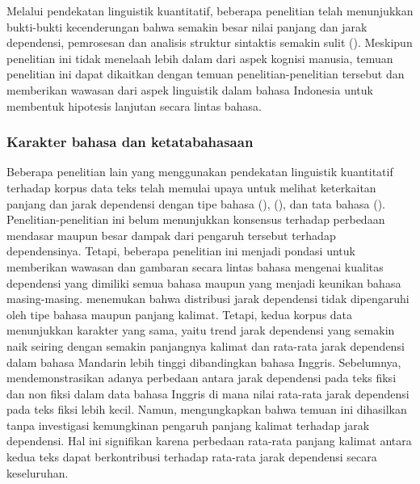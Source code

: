 Melalui pendekatan linguistik kuantitatif, beberapa penelitian telah menunjukkan bukti-bukti kecenderungan bahwa semakin besar nilai panjang dan jarak dependensi, pemrosesan dan analisis struktur sintaktis semakin sulit (\citealp{gibson1998linguistic, hiranuma1999syntactic, jiang2015effects, temperley2007minimization}). Meskipun penelitian ini tidak menelaah lebih dalam dari aspek kognisi manusia, temuan penelitian ini dapat dikaitkan dengan temuan penelitian-penelitian tersebut dan memberikan wawasan dari aspek linguistik dalam bahasa Indonesia untuk membentuk hipotesis lanjutan secara lintas bahasa.

\subsubsection{Karakter bahasa dan ketatabahasaan}
Beberapa penelitian lain yang menggunakan pendekatan linguistik kuantitatif terhadap korpus data teks telah memulai upaya untuk melihat keterkaitan panjang dan jarak dependensi dengan tipe bahasa (\citealp{hiranuma1999syntactic, eppler2005syntax, liu2012quantitative}), (\citealp{oya2011syntactic, ferrer2014risks, jiang2015effects}), dan tata bahasa (\citealp{liu2008dependency, gildea2010grammars}). Penelitian-penelitian ini belum menunjukkan konsensus terhadap perbedaan mendasar maupun besar dampak dari pengaruh tersebut terhadap dependensinya. Tetapi, beberapa penelitian ini menjadi pondasi untuk memberikan wawasan dan gambaran secara lintas bahasa mengenai kualitas dependensi yang dimiliki semua bahasa maupun yang menjadi keunikan bahasa masing-masing. \cite{jiang2015effects} menemukan bahwa distribusi jarak dependensi tidak dipengaruhi oleh tipe bahasa maupun panjang kalimat. Tetapi, kedua korpus data menunjukkan karakter yang sama, yaitu trend jarak dependensi yang semakin naik seiring dengan semakin panjangnya kalimat dan rata-rata jarak dependensi dalam bahasa Mandarin lebih tinggi dibandingkan bahasa Inggris. Sebelumnya, \cite{oya2013degree} mendemonstrasikan adanya perbedaan antara jarak dependensi pada teks fiksi dan non fiksi dalam data bahasa Inggris di mana nilai rata-rata jarak dependensi pada teks fiksi lebih kecil. Namun, \cite{wang2017effects} mengungkapkan bahwa temuan ini dihasilkan tanpa investigasi kemungkinan pengaruh panjang kalimat terhadap jarak dependensi. Hal ini signifikan karena perbedaan rata-rata panjang kalimat antara kedua teks dapat berkontribusi terhadap rata-rata jarak dependensi secara keseluruhan.


